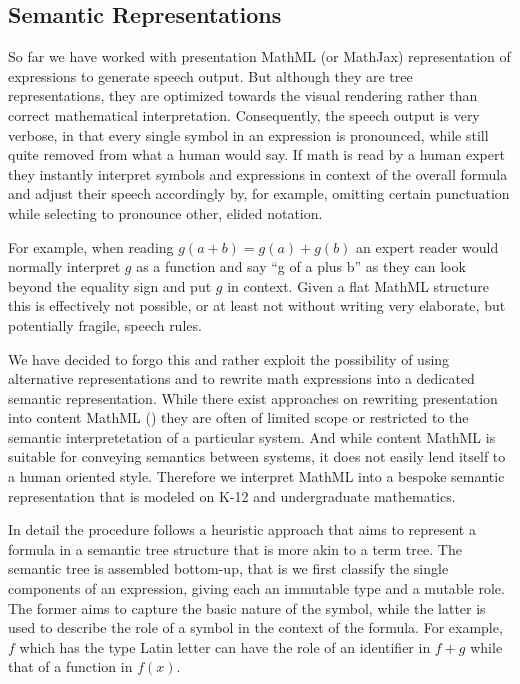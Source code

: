\documentclass{sig-alternate}
\begin{document}
\subsection{Semantic Representations}
\label{sec:semantic}

So far we have worked with presentation MathML (or MathJax)
representation of expressions to generate speech output. But although they are
tree representations, they are optimized towards the visual rendering rather
than correct mathematical interpretation.  Consequently, the speech output is
very verbose, in that every single symbol in an expression is pronounced, while
still quite removed from what a human would say. If math is read by a human
expert they instantly interpret symbols and expressions in context of the
overall formula and adjust their speech accordingly by, for example, omitting
certain punctuation while selecting to pronounce other, elided notation.

For example, when reading $g(a+b)=g(a) + g(b)$ an expert reader would normally
interpret $g$ as a function and say ``g of a plus b'' as they can look beyond the
equality sign and put $g$ in context. Given a flat MathML structure this is
effectively not possible, or at least not without writing very elaborate, but
potentially fragile, speech rules.


We have decided to forgo this and rather exploit the possibility of using
alternative representations and to rewrite math expressions into a dedicated
semantic representation. While there exist approaches on rewriting presentation
into content MathML (\cite{snuggletex}) they are often of limited scope or
restricted to the semantic interpretetation of a particular system.  And while
content MathML is suitable for conveying semantics between systems, it does not
easily lend itself to a human oriented style. Therefore we interpret MathML into a
bespoke semantic representation that is modeled on K-12 and undergraduate
mathematics.

In detail the procedure follows a heuristic approach that aims to represent a
formula in a semantic tree structure that is more akin to a term tree. The
semantic tree is assembled bottom-up, that is we first classify the single
components of an expression, giving each an immutable type and a mutable
role. The former aims to capture the basic nature of the symbol, while the
latter is used to describe the role of a symbol in the context of the formula.
For example, $f$ which has the type Latin letter can have the role of an
identifier in $f + g$ while that of a function in $f(x)$.
\end{document}
